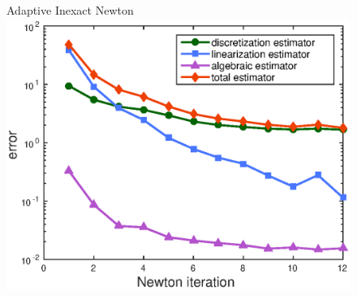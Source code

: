 \documentclass[10 pt]{beamer}
\begin{document}
\begin{frame}
\begin{figure}
\begin{minipage}[c]{.32\linewidth}
  \centering
  Adaptive Inexact Newton  
   \includegraphics[width=\textwidth]{fig_article/estimators_newton_step_adapt_inexact_resolution.eps}     
\end{minipage}\hfill
\end{figure}
\end{frame}


%
\end{document}
